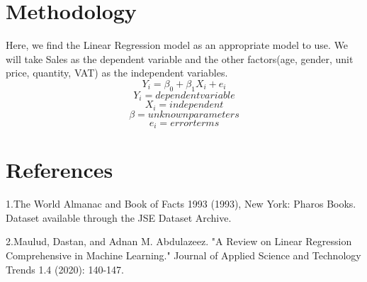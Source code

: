 \documentclass[twoside,a4paper,12pt]{article}
\begin{document}
\section*{Methodology} 
Here, we find the Linear Regression model as an appropriate model to use.
We will take Sales as the dependent variable and the other factors(age, gender, unit price, quantity, VAT) as the independent variables.
\begin{equation}
	Y_i=\beta_0+\beta_1 X_i + e_i
\end{equation}	
\begin{equation}	
	Y_i	=	dependent variable
\end{equation}
	\begin{equation}
	X_i	=	independent
\end{equation} 
	\begin{equation}
	\beta	=	unknown parameters
\end{equation}
	\begin{equation}
	e_i	=	error terms
\end{equation}







\section*{References} 

1.The World Almanac and Book of Facts 1993 (1993), New York: Pharos Books. Dataset available through the JSE Dataset Archive.

2.Maulud, Dastan, and Adnan M. Abdulazeez. "A Review on Linear Regression Comprehensive in Machine Learning." Journal of Applied Science and Technology Trends 1.4 (2020): 140-147.
\end{document}
